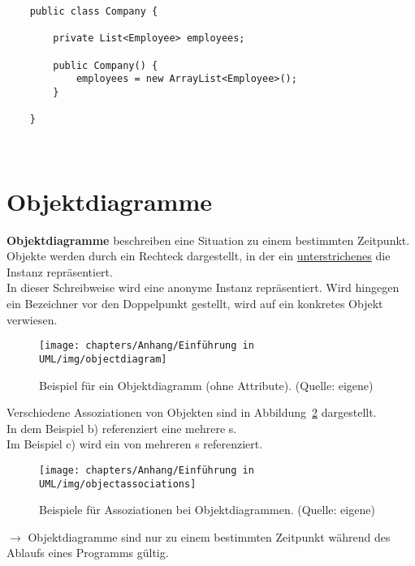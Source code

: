 \begin{verbatim}
    public class Company {

        private List<Employee> employees;

        public Company() {
            employees = new ArrayList<Employee>();
        }

    }
\end{verbatim}\\

\section{Objektdiagramme}

\textbf{Objektdiagramme} beschreiben eine Situation zu einem bestimmten Zeitpunkt.\\

\noindent
Objekte werden durch ein Rechteck dargestellt, in der ein \ul{unterstrichenes} \code{:[Klassenname]} die Instanz repräsentiert. \\
In dieser Schreibweise wird eine anonyme Instanz repräsentiert.
Wird hingegen ein Bezeichner vor den Doppelpunkt gestellt, wird auf ein konkretes Objekt verwiesen.\\

\begin{figure}
    \centering
    \texttt{[image: chapters/Anhang/Einführung in UML/img/objectdiagram]}
    \caption{Beispiel für ein Objektdiagramm (ohne Attribute). (Quelle: eigene)}
    \label{fig:objectdiagram}
\end{figure}

\noindent
Verschiedene Assoziationen von Objekten sind in Abbildung~\ref{fig:objectassociations} dargestellt.\\
In dem Beispiel b) referenziert eine  mehrere s.\\
Im Beispiel c) wird ein  von mehreren s referenziert.\\

\begin{figure}
    \centering
    \texttt{[image: chapters/Anhang/Einführung in UML/img/objectassociations]}
    \caption{Beispiele für Assoziationen bei Objektdiagrammen. (Quelle: eigene)}
    \label{fig:objectassociations}
\end{figure}

\noindent
$\rightarrow$ Objektdiagramme sind nur zu einem bestimmten Zeitpunkt während des Ablaufs eines Programms gültig.\\

